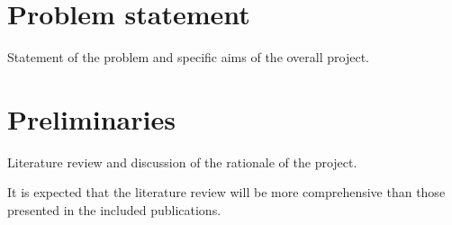 \clearpage\section{Problem statement}\label{sec:intro}

Statement of the problem and specific aims of the overall project.


\clearpage\section{Preliminaries}\label{sec:pre}

Literature review and discussion of the rationale of the project.

It is expected that the literature review will be more comprehensive than
those presented in the included publications.

